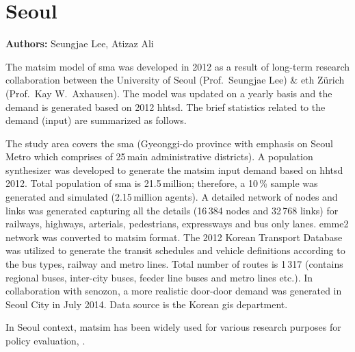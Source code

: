 \section{Seoul}
\label{sec:seoul}
\hfill \textbf{Authors:} Seungjae Lee, Atizaz Ali

The \gls{matsim} model of \gls{sma} was developed in 2012 as a result of long-term research collaboration between the University of Seoul (Prof.\ Seungjae Lee) \& \gls{eth} Zürich (Prof.\ Kay W.\ Axhausen). The model was updated on a yearly basis and the demand is generated based on 2012 \gls{hhtsd}. The brief statistics related to the demand (input) are summarized as follows. 

The study area covers the \gls{sma} (Gyeonggi-do province with emphasis on Seoul Metro which comprises of 25\,main administrative districts). A population synthesizer was developed to generate the \gls{matsim} input demand based on \gls{hhtsd} 2012. Total population of \gls{sma} is 21.5\,million; therefore, a 10\,\% sample was generated and simulated (2.15\,million agents). A detailed network of nodes and links was generated capturing all the details (16\,384 nodes and 32\,768 links) for railways, highways, arterials, pedestrians, expressways and bus only lanes. \gls{emme2} network was converted to \gls{matsim} format. The 2012 Korean Transport Database was utilized to generate the transit schedules and vehicle definitions according to the bus types, railway and metro lines. Total number of routes is 1\,317 (contains regional buses, inter-city buses, feeder line buses and metro lines etc.). In collaboration with \gls{senozon}, a more realistic door-door demand was generated in Seoul City in July 2014. Data source is the Korean \gls{gis} department.

In Seoul context, \gls{matsim} has been widely used for various research purposes for policy evaluation, \citet[e.g.,][]{KimEtAl_IJHE_2012, LeeAli_unpub_IWUTSCD_2014}.

